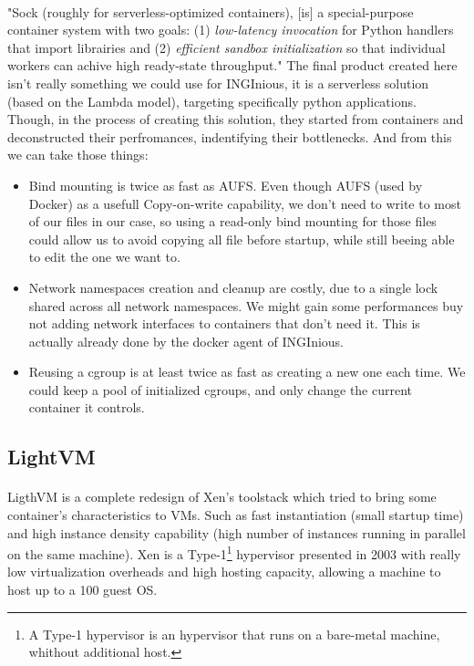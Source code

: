 \paragraph{}"Sock (roughly for serverless-optimized containers), [is] a special-purpose container system with two goals: (1) \textit{low-latency invocation} for Python handlers that import librairies and (2) \textit{efficient sandbox initialization} so that individual workers can achive high ready-state throughput." \cite{oakes2018sock}  The final product created here isn't really something we could use for INGInious, it is a serverless solution (based on the Lambda model), targeting specifically python applications.  Though, in the process of creating this solution, they started from containers and deconstructed their perfromances, indentifying their bottlenecks.  And from this we can take those things:
\begin{itemize}
\renewcommand\labelitemi{--}
  \item Bind mounting is twice as fast as AUFS.  Even though AUFS (used by Docker) as a usefull Copy-on-write capability, we don't need to write to most of our files in our case, so using a read-only bind mounting for those files could allow us to avoid copying all file before startup, while still beeing able to edit the one we want to.
  \item Network namespaces creation and cleanup are costly, due to a single lock shared across all network namespaces.  We might gain some performances buy not adding network interfaces to containers that don't need it.  This is actually already done by the docker agent of INGInious.
  \item Reusing a cgroup is at least twice as fast as creating a new one each time.  We could keep a pool of initialized cgroups, and only change the current container it controls.
\end{itemize}

\subsection{LightVM} 
\paragraph{}LigthVM is a complete redesign of Xen's toolstack which tried to bring some container's characteristics to VMs.  Such as fast instantiation (small startup time) and high instance density capability (high number of instances running in parallel on the same machine).\cite{manco2017my}  Xen is a Type-1\footnote{A Type-1 hypervisor is an hypervisor that runs on a bare-metal machine, whithout additional host.} hypervisor presented in 2003 with really low virtualization overheads and high hosting capacity, allowing a machine to host up to a 100 guest OS.\cite{barham2003xen}  
